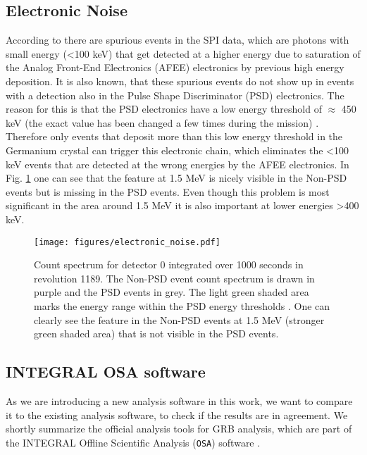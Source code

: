 \documentclass[twocolumn,traditabstract]{aa}
\begin{document}
\subsection{Electronic Noise}
\label{electronic}
According to \citet{spi_electronic_noise} there are spurious events in the SPI data, which are photons with small energy (<100 keV) that get detected at a higher energy due to saturation of the Analog Front-End Electronics (AFEE) electronics by previous high energy deposition. It is also known, that these spurious events do not show up in events with a detection also in the Pulse Shape Discriminator (PSD) electronics. The reason for this is that the PSD electronics have a low energy threshold of $\approx$ 450 keV (the exact value has been changed a few times during the mission) \citep{spi_electronic_noise}. Therefore only events that deposit more than this low energy threshold in the Germanium crystal can trigger this electronic chain, which eliminates the <100 keV events that are detected at the wrong energies by the AFEE electronics. In Fig. \ref{fig:electronic} one can see that the feature at 1.5 MeV is nicely visible in the Non-PSD events but is missing in the PSD events. Even though this problem is most significant in the area around 1.5 MeV it is also important at lower energies >400 keV.

\begin{figure}[ht]
    \begin{centering}
        \texttt{[image: figures/electronic\_noise.pdf]}
        \caption{Count spectrum for detector 0 integrated over 1000 seconds in revolution 1189. The Non-PSD event count spectrum is drawn in purple and the PSD events in grey. The light green shaded area marks the energy range within the PSD energy thresholds \citep{spi_electronic_noise}. One can clearly see the feature in the Non-PSD events at 1.5 MeV (stronger green shaded area) that is not visible in the PSD events.}
        \label{fig:electronic}
    \end{centering}
\end{figure}

\subsection{INTEGRAL OSA software}
\label{OSA}

As we are introducing a new analysis software in this work, we want to compare it to the existing analysis software, to check if the results are in agreement. We shortly summarize the official analysis tools for GRB analysis, which are part of the INTEGRAL Offline Scientific Analysis ({\tt OSA}) software \citep{osa}.
\end{document}
